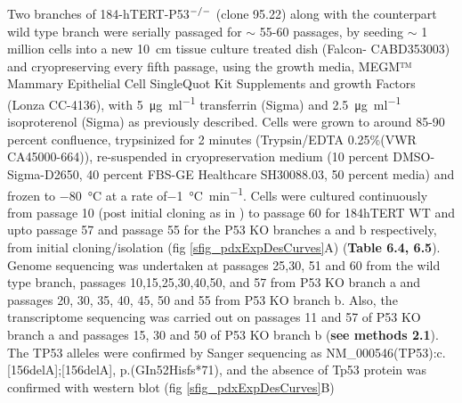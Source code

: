 \documentclass{article}
\begin{document}
Two branches of 184-hTERT-P53$^{\small{-/-}}$ (clone 95.22) along with the counterpart wild type branch were serially passaged for $\sim$ 55-60 passages, by seeding $\sim$ 1 million cells into a new \SI{10}{\cm} tissue culture treated dish (Falcon- CABD353003) and cryopreserving every fifth passage,
using the growth media, MEGM™ Mammary Epithelial Cell SingleQuot Kit Supplements and growth Factors (Lonza CC-4136), 
with \SI{5}{\ug\per\ml} transferrin (Sigma) and \SI{2.5}{\ug\per\ml} isoproterenol (Sigma) as previously described. Cells were grown to around 85-90 percent confluence, 
trypsinized for 2 minutes (Trypsin/EDTA 0.25\%(VWR CA45000-664)),
re-suspended in cryopreservation medium (10 percent DMSO-Sigma-D2650,
40 percent FBS-GE Healthcare SH30088.03, 50 percent media) and frozen to \SI{-80}{\degreeCelsius} at a rate of\SI{-1}{\degreeCelsius\per\minute}. 
Cells were cultured continuously from passage 10 (post initial cloning as in \cite{burleigh2015co}) to passage 60 for 184hTERT WT and upto passage 57 and passage 55 for the P53 KO branches a and b respectively, from initial cloning/isolation (fig \ref{sfig_pdxExpDesCurves}A)
(\textbf{Table 6.4, 6.5}). 
Genome sequencing was undertaken at passages 25,30, 51 and 60 from the wild type branch, passages 10,15,25,30,40,50, and 57 from P53 KO branch a and passages 20, 30, 35, 40, 45, 50 and 55 from P53 KO branch b. Also, the transcriptome sequencing was carried out on passages 11 and 57 of P53 KO branch a and passages 15, 30 and 50 of P53 KO branch b (\textbf{see methods 2.1}).   
The TP53 alleles were confirmed by Sanger sequencing as  NM\_000546(TP53):c.[156delA];[156delA], p.(GIn52Hisfs*71), and the absence of Tp53 protein was confirmed with western blot (fig \ref{sfig_pdxExpDesCurves}B)
\end{document}
